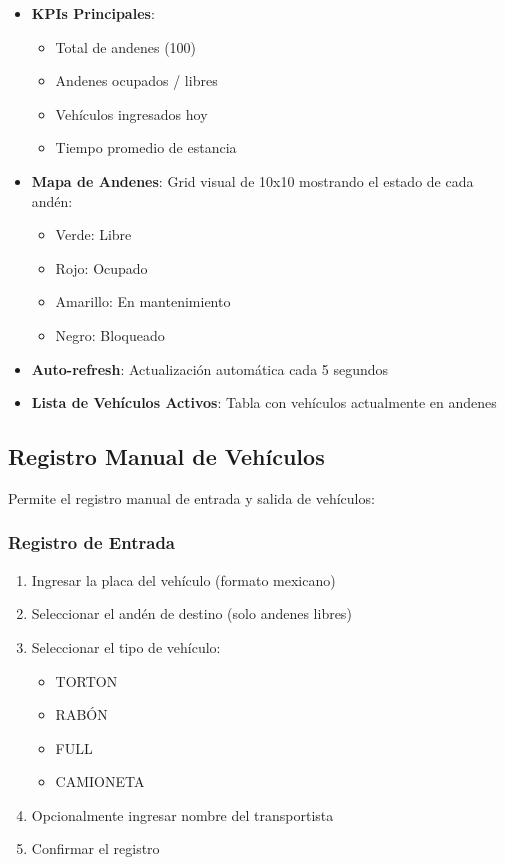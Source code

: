 \documentclass[12pt,a4paper]{article}
\begin{document}
\begin{itemize}
    \item \textbf{KPIs Principales}:
    \begin{itemize}
        \item Total de andenes (100)
        \item Andenes ocupados / libres
        \item Vehículos ingresados hoy
        \item Tiempo promedio de estancia
    \end{itemize}
    
    \item \textbf{Mapa de Andenes}: Grid visual de 10x10 mostrando el estado de cada andén:
    \begin{itemize}
        \item[\textcolor{success}{\faIcon{circle}}] Verde: Libre
        \item[\textcolor{danger}{\faIcon{circle}}] Rojo: Ocupado
        \item[\textcolor{warning}{\faIcon{circle}}] Amarillo: En mantenimiento
        \item[\faIcon{circle}] Negro: Bloqueado
    \end{itemize}
    
    \item \textbf{Auto-refresh}: Actualización automática cada 5 segundos
    
    \item \textbf{Lista de Vehículos Activos}: Tabla con vehículos actualmente en andenes
\end{itemize}

\subsection{Registro Manual de Vehículos}

Permite el registro manual de entrada y salida de vehículos:

\subsubsection{Registro de Entrada}

\begin{enumerate}
    \item Ingresar la placa del vehículo (formato mexicano)
    \item Seleccionar el andén de destino (solo andenes libres)
    \item Seleccionar el tipo de vehículo:
    \begin{itemize}
        \item TORTON
        \item RABÓN
        \item FULL
        \item CAMIONETA
    \end{itemize}
    \item Opcionalmente ingresar nombre del transportista
    \item Confirmar el registro
\end{enumerate}
\end{document}
